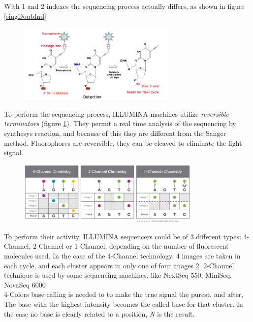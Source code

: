 With 1 and 2 indexes the sequencing process actually differs, as shown in figure \ref{singDoubInd}


\begin{figure}[H]
\caption{}
\centering
\includegraphics[width=0.7\textwidth]{ILLUMINArev}
\label{ILLUMINArev}
\end{figure}

To perform the sequencing process, ILLUMINA machines utilize \textit{reversible terminators} (figure \ref{ILLUMINArev}). They permit a real time analysis of the sequencing by synthesys reaction, and because of this they are different from the Sanger method. Fluorophores are reversible, they can be cleaved to eliminate the light signal.

\begin{figure}[h]
\caption{}
\centering
\includegraphics[width=0.8\textwidth]{ChannelILLUMINA}
\label{ChannelILLUMINA}
\end{figure}

To perform their activity, ILLUMINA sequencers could be of 3 different types: 4-Channel, 2-Channel or 1-Channel, depending on the number of fluorescent molecules used. In the case of the 4-Channel technology, 4 images are taken in each cycle, and each  cluster appears in only one of four images \ref{ChannelILLUMINA}. 2-Channel technique is used by some sequencing machines, like NextSeq 550, MiniSeq, NovaSeq 6000\\

4-Colors base calling
is needed to to make
the true signal the purest, and after, The base with the highest intensity becomes the called base for that cluster. In the case no base is clearly related to a position, \textit{N} is the result.


